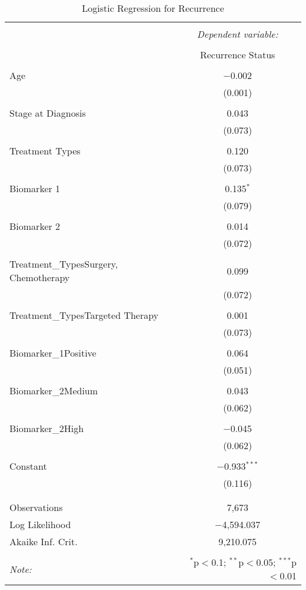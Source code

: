 
\begin{table}[!htbp] \centering 
  \caption{Logistic Regression for Recurrence} 
  \label{} 
\begin{tabular}{@{\extracolsep{5pt}}lc} 
\\[-1.8ex]\hline 
\hline \\[-1.8ex] 
 & \multicolumn{1}{c}{\textit{Dependent variable:}} \\ 
\cline{2-2} 
\\[-1.8ex] & Recurrence Status \\ 
\hline \\[-1.8ex] 
 Age & $-$0.002 \\ 
  & (0.001) \\ 
  & \\ 
 Stage at Diagnosis & 0.043 \\ 
  & (0.073) \\ 
  & \\ 
 Treatment Types & 0.120 \\ 
  & (0.073) \\ 
  & \\ 
 Biomarker 1 & 0.135$^{*}$ \\ 
  & (0.079) \\ 
  & \\ 
 Biomarker 2 & 0.014 \\ 
  & (0.072) \\ 
  & \\ 
 Treatment\_TypesSurgery, Chemotherapy & 0.099 \\ 
  & (0.072) \\ 
  & \\ 
 Treatment\_TypesTargeted Therapy & 0.001 \\ 
  & (0.073) \\ 
  & \\ 
 Biomarker\_1Positive & 0.064 \\ 
  & (0.051) \\ 
  & \\ 
 Biomarker\_2Medium & 0.043 \\ 
  & (0.062) \\ 
  & \\ 
 Biomarker\_2High & $-$0.045 \\ 
  & (0.062) \\ 
  & \\ 
 Constant & $-$0.933$^{***}$ \\ 
  & (0.116) \\ 
  & \\ 
\hline \\[-1.8ex] 
Observations & 7,673 \\ 
Log Likelihood & $-$4,594.037 \\ 
Akaike Inf. Crit. & 9,210.075 \\ 
\hline 
\hline \\[-1.8ex] 
\textit{Note:}  & \multicolumn{1}{r}{$^{*}$p$<$0.1; $^{**}$p$<$0.05; $^{***}$p$<$0.01} \\ 
\end{tabular} 
\end{table} 
